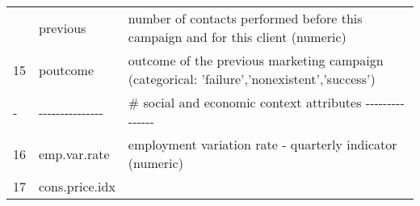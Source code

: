 \documentclass[11pt]{article}
\begin{document}
\begin{longtable}[]{@{}lll@{}}
\begin{minipage}[t]{0.01\columnwidth}
\end{minipage} & \begin{minipage}[t]{0.12\columnwidth}\raggedright\strut
previous\strut
\end{minipage} & \begin{minipage}[t]{0.78\columnwidth}\raggedright\strut
number of contacts performed before this campaign and for this client
(numeric)\strut
\end{minipage}\tabularnewline
\begin{minipage}[t]{0.01\columnwidth}\raggedright\strut
15\strut
\end{minipage} & \begin{minipage}[t]{0.12\columnwidth}\raggedright\strut
poutcome\strut
\end{minipage} & \begin{minipage}[t]{0.78\columnwidth}\raggedright\strut
outcome of the previous marketing campaign (categorical:
'failure','nonexistent','success')\strut
\end{minipage}\tabularnewline
\begin{minipage}[t]{0.01\columnwidth}\raggedright\strut
-\strut
\end{minipage} & \begin{minipage}[t]{0.12\columnwidth}\raggedright\strut
-\/-\/-\/-\/-\/-\/-\/-\/-\/-\/-\/-\/-\/-\/-\strut
\end{minipage} & \begin{minipage}[t]{0.78\columnwidth}\raggedright\strut
\# social and economic context attributes
-\/-\/-\/-\/-\/-\/-\/-\/-\/-\/-\/-\/-\/-\/-\strut
\end{minipage}\tabularnewline
\begin{minipage}[t]{0.01\columnwidth}\raggedright\strut
16\strut
\end{minipage} & \begin{minipage}[t]{0.12\columnwidth}\raggedright\strut
emp.var.rate\strut
\end{minipage} & \begin{minipage}[t]{0.78\columnwidth}\raggedright\strut
employment variation rate - quarterly indicator (numeric)\strut
\end{minipage}\tabularnewline
\begin{minipage}[t]{0.01\columnwidth}\raggedright\strut
17\strut
\end{minipage} & \begin{minipage}[t]{0.12\columnwidth}\raggedright\strut
cons.price.idx\strut
\end{minipage} & \begin{minipage}[t]{0.78\columnwidth}\raggedright\strut

\end{minipage}
\end{longtable}
\end{document}
